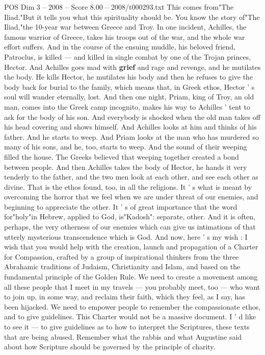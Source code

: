 \begin{textsample}{POS Dim 3 – 2008 – Score 8.00 – 2008/t000293.txt}
This comes from"The Iliad."But it tells you what this spirituality should be.
You know the story of"The Iliad,"the 10-year war between Greece and Troy.
In one incident, Achilles, the famous warrior of Greece, takes his troops out of the war, and the whole war effort suffers.
And in the course of the ensuing muddle, his beloved friend, Patroclus, is killed — and killed in single combat by one of the Trojan princes, Hector.
And Achilles goes mad with \textbf{grief} and rage and revenge, and he mutilates the body.
He kills Hector, he mutilates his body and then he refuses to give the body back for burial to the family, which means that, in Greek ethos, Hector ' s soul will wander eternally, lost.
And then one night, Priam, king of Troy, an old man, comes into the Greek camp incognito, makes his way to Achilles ' tent to ask for the body of his son.
And everybody is shocked when the old man takes off his head covering and shows himself.
And Achilles looks at him and thinks of his father.
And he starts to weep.
And Priam looks at the man who has murdered so many of his sons, and he, too, starts to weep.
And the sound of their weeping filled the house.
The Greeks believed that weeping together created a bond between people.
And then Achilles takes the body of Hector, he hands it very tenderly to the father, and the two men look at each other, and see each other as divine.
That is the ethos found, too, in all the religions.
It ' s what is meant by overcoming the horror that we feel when we are under threat of our enemies, and beginning to appreciate the other.
It ' s of great importance that the word for"holy"in Hebrew, applied to God, is"Kadosh": separate, other.
And it is often, perhaps, the very otherness of our enemies which can give us intimations of that utterly mysterious transcendence which is God.
And now, here ' s my wish : I wish that you would help with the creation, launch and propagation of a Charter for Compassion, crafted by a group of inspirational thinkers from the three Abrahamic traditions of Judaism, Christianity and Islam, and based on the fundamental principle of the Golden Rule.
We need to create a movement among all these people that I meet in my travels — you probably meet, too — who want to join up, in some way, and reclaim their faith, which they feel, as I say, has been hijacked.
We need to empower people to remember the compassionate ethos, and to give guidelines.
This Charter would not be a massive document.
I ' d like to see it — to give guidelines as to how to interpret the Scriptures, these texts that are being abused.
Remember what the rabbis and what Augustine said about how Scripture should be governed by the principle of charity.

\end{textsample}
